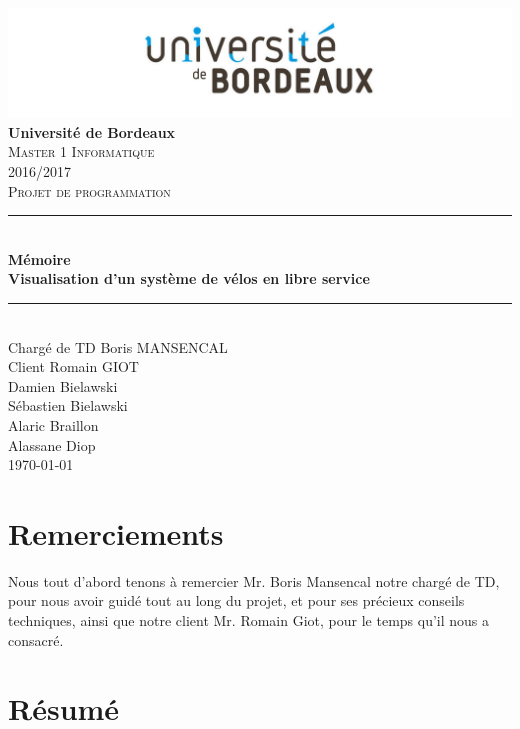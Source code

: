 \documentclass[12pt]{article}
\begin{document}
	\begin{titlepage}
		\includegraphics[scale=0.2]{logo_bordeaux.png}\\
		\centering
		\linebreak
		{\LARGE \bfseries Université de Bordeaux}\\ [2cm]
		\textsc{\Large Master 1 Informatique}\\ [0,3cm]
		\textsc{\Large 2016/2017}\\ [1,4cm]

		\textsc{\Large Projet de programmation}\\ [1.4cm]

		\rule{16cm}{1mm}\\ [0,7cm]
		{\huge \bfseries Mémoire}\\ [0,5cm]
		{\huge \bfseries Visualisation d'un système de vélos en libre service} \\[0,7cm]
		\rule{16cm}{1mm}\\ [1cm]

		{\Large Chargé de TD Boris MANSENCAL }\\ [0,3cm]
		{\Large Client Romain GIOT }\\ [1cm]

		{\Large Damien Bielawski }\\ [0,3cm]
		{\Large Sébastien Bielawski }\\[0,3cm]
		{\Large Alaric Braillon }\\ [0,3cm]
		{\Large Alassane Diop }\\ [2cm]
		\Large\today

	\end{titlepage}

\newpage
\section*{Remerciements} 
	Nous tout d'abord tenons à remercier Mr. Boris Mansencal notre chargé de TD, pour nous avoir guidé tout au long du projet, et pour ses précieux conseils techniques, ainsi que notre client Mr. Romain Giot, pour le temps qu'il nous a consacré.	
	
\newpage
\section*{Résumé}
\end{document}
